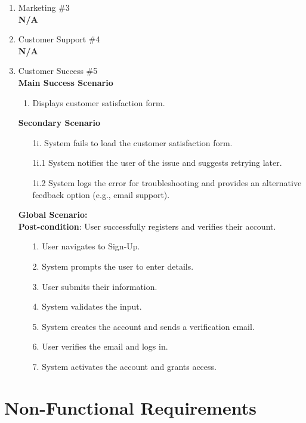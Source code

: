 \documentclass[]{article}
\begin{document}
\begin{enumerate}[{\bf BE1.}]
\begin{enumerate}[{\bf VP1.}]
 \item Marketing \#3 \\
	\textbf{N/A}

\item Customer Support \#4 \\
	\textbf{N/A}  

\item Customer Success \#5 \\
    \textbf{Main Success Scenario}
    \begin{enumerate}
		\item Displays customer satisfaction form.
    \end{enumerate}
    \textbf{Secondary Scenario}
   \begin{enumerate}
		\item[1i.] System fails to load the customer satisfaction form.
            \item[1i.1] System notifies the user of the issue and suggests retrying later.
            \item[1i.2] System logs the error for troubleshooting and provides an alternative feedback option (e.g., email support).
    \end{enumerate} 
	\textbf{Global Scenario:} \\
	\textbf{Post-condition}:  User successfully registers and verifies their account.

	\begin{enumerate}
		\item[1.] User navigates to Sign-Up.
		\item[2.] System prompts the user to enter details.
		\item[3.] User submits their information.
		\item[4.] System validates the input.
		\item[5.] System creates the account and sends a verification email.
		\item[6.] User verifies the email and logs in.
		\item[7.] System activates the account and grants access.
	\end{enumerate}


\end{enumerate}

\end{enumerate}

\section{Non-Functional Requirements}
\label{sec:non-functional_requirements}
\end{document}
